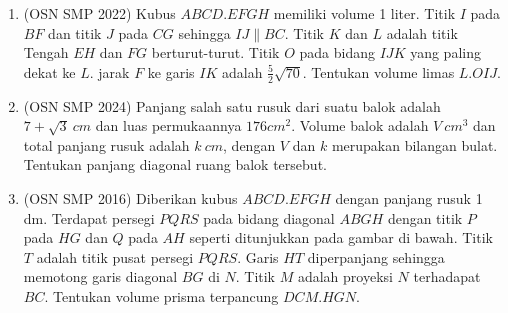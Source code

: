 \documentclass[a4paper, 12pt]{article}
\begin{document}
\begin{enumerate}
\begin{center}
    \end{center}

    \item (OSN SMP 2022) Kubus $ABCD.EFGH$ memiliki volume 1 liter. Titik $I$ pada $BF$ dan titik $J$ pada $CG$ sehingga $IJ \parallel BC$. Titik $K$ dan $L$ adalah titik Tengah $EH$ dan $FG$ berturut-turut. Titik $O$ pada bidang $IJK$ yang paling dekat ke $L$. jarak $F$ ke garis $IK$ adalah $\frac{5}{2}\sqrt{70}$. Tentukan volume limas $L.OIJ$.

    \item (OSN SMP 2024) Panjang salah satu rusuk dari suatu balok adalah $7 + \sqrt{3}~cm$ dan luas permukaannya $176 cm^2$. Volume balok adalah $V~cm^3$ dan total panjang rusuk adalah $k~cm$, dengan $V$ dan $k$ merupakan bilangan bulat. Tentukan panjang diagonal ruang balok tersebut.

    \item (OSN SMP 2016) Diberikan kubus $ABCD.EFGH$ dengan panjang rusuk 1 dm. Terdapat persegi $PQRS$ pada bidang diagonal $ABGH$ dengan titik $P$ pada $HG$ dan $Q$ pada $AH$ seperti ditunjukkan pada gambar di bawah. Titik $T$ adalah titik pusat persegi $PQRS$. Garis $HT$ diperpanjang sehingga memotong garis diagonal $BG$ di $N$. Titik $M$ adalah proyeksi $N$ terhadapat $BC$. Tentukan volume prisma terpancung $DCM.HGN$.
    \begin{center}
\end{center}
\end{enumerate}
\end{document}

